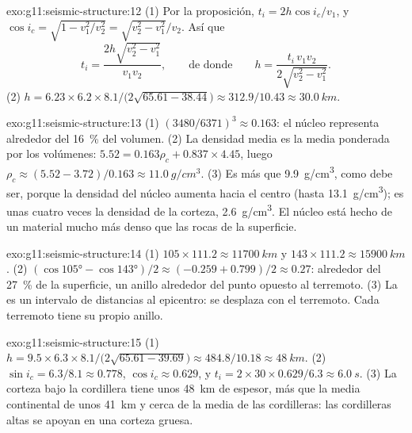 \begin{solution}{exo:g11:seismic-structure:12}
(1) Por la proposición, $t_i = 2h\cos i_c/v_1$, y $\cos i_c = \sqrt{1 -
v_1^2/v_2^2} = \sqrt{v_2^2 - v_1^2}/v_2$. Así que
\[
  t_i = \frac{2h\sqrt{v_2^2 - v_1^2}}{v_1 v_2},
  \qquad\text{de donde}\qquad
  h = \frac{t_i\,v_1 v_2}{2\sqrt{v_2^2 - v_1^2}}.
\]
(2) $h = 6.23 \times 6.2 \times 8.1/\bigl(2\sqrt{65.61 -
38.44}\bigr) \approx 312.9/10.43 \approx \qty{30.0}{km}$.
\end{solution}

\begin{solution}{exo:g11:seismic-structure:13}
(1) $(3480/6371)^3 \approx 0.163$: el núcleo representa alrededor del
\qty{16}{\percent} del volumen. (2) La densidad media es la media ponderada
por los volúmenes: $5.52 = 0.163
\rho_c + 0.837 \times 4.45$, luego $\rho_c \approx (5.52 - 3.72)/0.163 \approx
\qty{11.0}{g/cm^3}$. (3) Es más que \qty{9.9}{g/cm^3}, como debe ser, porque
la densidad del núcleo aumenta hacia el centro (hasta \qty{13.1}{g/cm^3});
es unas cuatro veces la densidad de la corteza, \qty{2.6}{g/cm^3}. El núcleo
está hecho de un material mucho más denso que las rocas de la superficie.
\end{solution}

\begin{solution}{exo:g11:seismic-structure:14}
(1) $105 \times 111.2 \approx \qty{11700}{km}$ y $143 \times 111.2 \approx
\qty{15900}{km}$. (2) $(\cos\ang{105} - \cos\ang{143})/2 \approx (-0.259 +
0.799)/2 \approx 0.27$: alrededor del \qty{27}{\percent} de la superficie, un
anillo alrededor del punto opuesto al terremoto. (3) La  es un
intervalo de distancias al epicentro: se desplaza con el terremoto. Cada
terremoto tiene su propio anillo.
\end{solution}

\begin{solution}{exo:g11:seismic-structure:15}
(1) $h = 9.5 \times 6.3 \times 8.1/\bigl(2\sqrt{65.61 - 39.69}\bigr) \approx
484.8/10.18 \approx \qty{48}{km}$. (2) $\sin i_c = 6.3/8.1 \approx 0.778$,
$\cos i_c \approx 0.629$, y $t_i = 2 \times 30 \times 0.629/6.3 \approx
\qty{6.0}{s}$. (3) La corteza bajo la cordillera tiene unos \qty{48}{km} de
espesor, más que la media continental de unos \qty{41}{km} y cerca de la
media de las cordilleras: las cordilleras altas se apoyan en una corteza
gruesa.
\end{solution}

